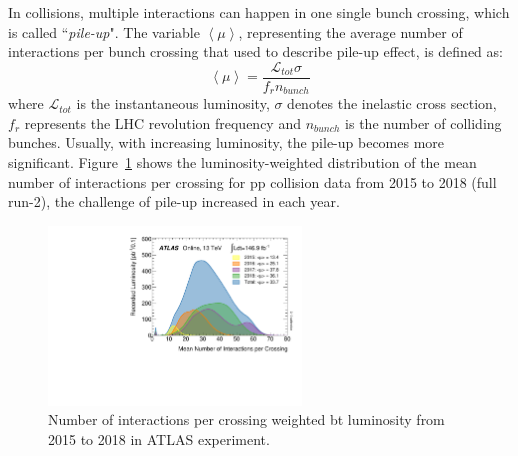 In collisions, multiple interactions can happen in one single bunch crossing, which is called ``\textit{pile-up}".
The variable $\left< \mu \right>$, representing the average number of interactions per bunch crossing that used to describe pile-up effect, is defined as:
\begin{equation}
    \left< \mu \right> = \frac{\mathcal{L}_{tot}\sigma}{f_{r}n_{bunch}}
\end{equation}
where $\mathcal{L}_{tot}$ is the instantaneous luminosity, $\sigma$ denotes the inelastic cross section,
$f_{r}$ represents the LHC revolution frequency and $n_{bunch}$ is the number of colliding bunches.
Usually, with increasing luminosity, the pile-up becomes more significant.
Figure~\ref{fig:run2_mu} shows the luminosity-weighted distribution of the mean number of interactions per crossing
for pp collision data from 2015 to 2018 (full run-2), the challenge of pile-up increased in each year.
\begin{figure}[!htb]
  \centering
  \includegraphics[width=0.6\textwidth]{figures/Detector/mu_2015_2018.pdf}
  \caption{Number of interactions per crossing weighted bt luminosity from 2015 to 2018 in ATLAS experiment.}
  \label{fig:run2_mu}
\end{figure}

